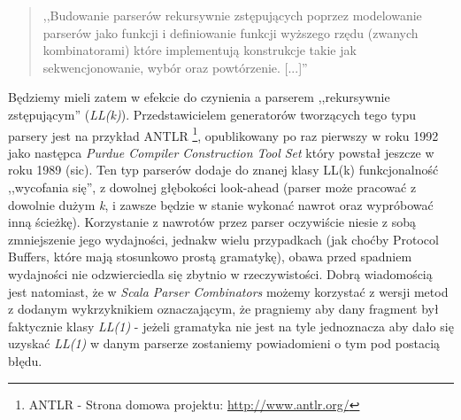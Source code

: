 \documentclass[pdflatex,11pt]{aghdpl}
\begin{document}
\begin{quotation}
 ,,Budowanie parserów rekursywnie zstępujących poprzez modelowanie parserów jako funkcji
   i definiowanie funkcji wyższego rzędu (zwanych kombinatorami) które implementują 
   konstrukcje takie jak sekwencjonowanie, wybór oraz powtórzenie. [...]''
   \cite{monadparsing}
\end{quotation}

Będziemy mieli zatem w efekcie do czynienia a parserem ,,rekursywnie zstępującym'' (\textit{LL(k)}). Przedstawicielem generatorów tworzących tego typu parsery jest na przykład
ANTLR \footnote{ANTLR - Strona domowa projektu: \href{http://www.antlr.org/}{http://www.antlr.org/}}, opublikowany po raz pierwszy w roku 1992 jako następca \textit{Purdue Compiler Construction Tool Set} który powstał jeszcze w roku 1989 (sic).
Ten typ parserów dodaje do znanej klasy LL(k) funkcjonalność ,,wycofania się'', z dowolnej głębokości look-ahead (parser może pracować z dowolnie dużym \textit{k},
i zawsze będzie w stanie wykonać nawrot oraz wypróbować inną ścieżkę). Korzystanie z nawrotów przez parser oczywiście niesie z sobą zmniejszenie jego wydajności,
jednakw wielu przypadkach (jak choćby Protocol Buffers, które mają stosunkowo prostą gramatykę), obawa przed spadniem wydajności nie odzwierciedla się zbytnio w 
rzeczywistości. Dobrą wiadomością jest natomiast, że w \textit{Scala Parser Combinators} możemy korzystać z wersji metod z dodanym wykrzyknikiem oznaczającym,
że pragniemy aby dany fragment był faktycznie klasy \textit{LL(1)} - jeżeli gramatyka nie jest na tyle jednoznacza aby dało się uzyskać \textit{LL(1)} w danym parserze
zostaniemy powiadomieni o tym pod postacią błędu.



\end{document}
